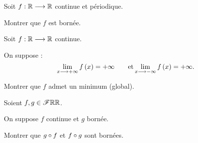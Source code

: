 \begin{corr}
\end{corr}

\begin{exo}[Exercice 13]
Soit \(f:\mathbb{R}\longrightarrow\mathbb{R}\) continue et périodique.

Montrer que \(f\) est bornée.
\end{exo}

\begin{corr}
\end{corr}

\begin{exo}[Exercice 14]
Soit \(f:\mathbb{R}\longrightarrow\mathbb{R}\) continue.

On suppose : \[\lim_{x\longrightarrow+\infty}f\left(x\right)=+\infty\qquad\text{et}\lim_{x\longrightarrow-\infty}f\left(x\right)=+\infty.\]

Montrer que \(f\) admet un minimum (global).
\end{exo}

\begin{corr}
\end{corr}

\begin{exo}[Exercice 15]
Soient \(f,g\in\mathscr{F}{\mathbb{R}}{\mathbb{R}}\).

On suppose \(f\) continue et \(g\) bornée.

Montrer que \(g\circ f\) et \(f\circ g\) sont bornées.
\end{exo}

\begin{corr}
\end{corr}


